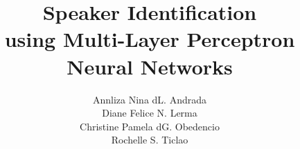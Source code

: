 \documentclass[letterpaper,12pt]{report}
\newlength{\defbaselineskip}
\newcommand{\setlinespacing}[1]
           {\setlength{\baselineskip}{#1 \defbaselineskip}}
\begin{document}
\nobib


\permissionfalse

\nolistoftables
\nolistoffigures
{}


\title{Speaker Identification \\ using Multi-Layer Perceptron
Neural Networks}


\author{Annliza Nina dL. Andrada \\
        Diane Felice N. Lerma \\
        Christine Pamela dG. Obedencio \\
        Rochelle S. Ticlao
}

{
\beforepreface
{} %
}
%
\afterpreface
%
\setlinespacing{1.66}


%
%
%
%
%

%

\end{document}
